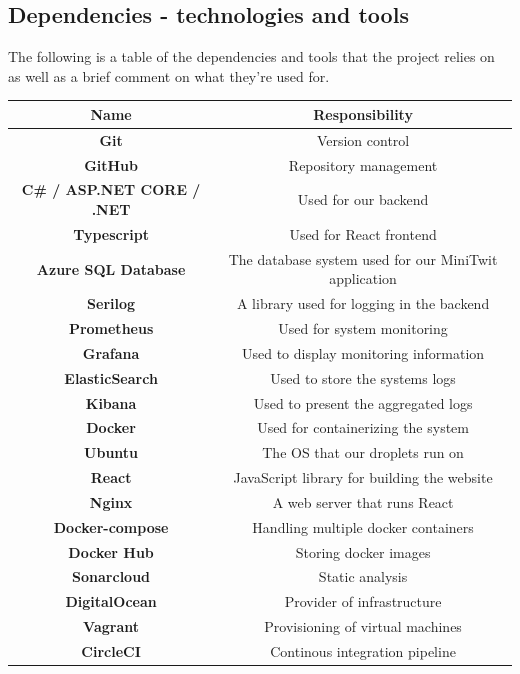 \subsection{Dependencies - technologies and tools}
The following is a table of the dependencies and tools that the project relies on as well as a brief comment on what they're used for.

\begin{center}
\begin{tabular}{||c | c ||} 
 \hline
 Name & Responsibility  \\ [0.5ex] 
 \hline\hline
 \textbf{Git} & Version control  \\ 
 \hline
 \textbf{GitHub} & Repository management \\
 \hline
 \textbf{C\# / ASP.NET CORE / .NET} & Used for our backend \\
 \hline
 \textbf{Typescript} & Used for React frontend \\
 \hline
 \textbf{Azure SQL Database} & The database system used for our MiniTwit application\\ 
 \hline
 \textbf{Serilog} & A library used for logging in the backend \\
 \hline
 \textbf{Prometheus} & Used for system monitoring \\
 \hline
 \textbf{Grafana} & Used to display monitoring information\\
 \hline
 \textbf{ElasticSearch} & Used to store the systems logs \\
 \hline
 \textbf{Kibana} & Used to present the aggregated logs \\
 \hline
 \textbf{Docker} & Used for containerizing the system \\
 \hline
 \textbf{Ubuntu} & The OS that our droplets run on\\
 \hline
 \textbf{React} & JavaScript library for building the website \\
 \hline
 \textbf{Nginx} & A web server that runs React\\
 \hline
 \textbf{Docker-compose} & Handling multiple docker containers \\
 \hline
 \textbf{Docker Hub} & Storing docker images \\
 \hline
 \textbf{Sonarcloud} & Static analysis \\
 \hline
 \textbf{DigitalOcean} & Provider of infrastructure \\
 \hline
 \textbf{Vagrant} & Provisioning of virtual machines \\
 \hline
 \textbf{CircleCI} & Continous integration pipeline \\

\end{tabular}
\end{center}
